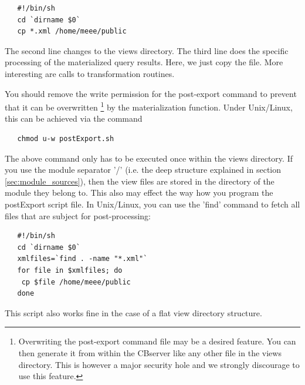\begin{verbatim}
   #!/bin/sh
   cd `dirname $0`
   cp *.xml /home/meee/public
\end{verbatim}

The second line changes to the views directory. The third line does the 
specific processing of the materialized query results. Here, we just copy the
file. More interesting are calls to transformation routines. 

You should remove the write permission for the post-export command to prevent that
it can be overwritten%
\footnote{Overwriting the post-export command file may be a desired feature. You can then
generate it from within the CBserver like any other file in the views directory. 
This is however a major security hole and we strongly discourage to use this feature.}
by the materialization function. Under Unix/Linux, this can be achieved via the command

\begin{verbatim}
   chmod u-w postExport.sh
\end{verbatim}

The above command only has to be executed once within the views directory.
If you use the module separator '/' (i.e. the deep structure explained in section \ref{sec:module_sources}),
then the view files are stored in the directory of the module they belong to.
This also may effect the way how you program the postExport script file. In Unix/Linux,
you can use the 'find' command to fetch all files that are subject for post-processing:

\begin{verbatim}
   #!/bin/sh
   cd `dirname $0`
   xmlfiles=`find . -name "*.xml"`
   for file in $xmlfiles; do
    cp $file /home/meee/public
   done
\end{verbatim}

This script also works fine in the case of a flat view directory structure.


